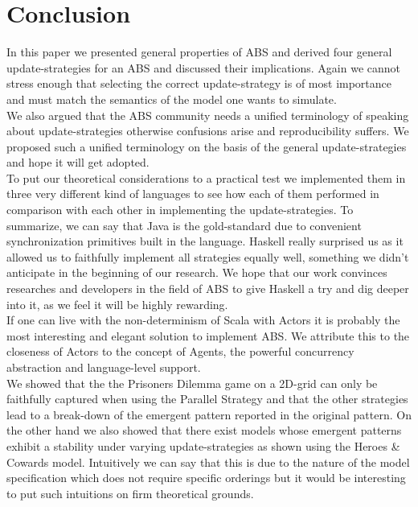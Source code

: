 \section{Conclusion}
In this paper we presented general properties of ABS and derived four general update-strategies for an ABS and discussed their implications. Again we cannot stress enough that selecting the correct update-strategy is of most importance and must match the semantics of the model one wants to simulate. \\
We also argued that the ABS community needs a unified terminology of speaking about update-strategies otherwise confusions arise and reproducibility suffers. We proposed such a unified terminology on the basis of the general update-strategies and hope it will get adopted. \\
To put our theoretical considerations to a practical test we implemented them in three very different kind of languages to see how each of them performed in comparison with each other in implementing the update-strategies. To summarize, we can say that Java is the gold-standard due to convenient synchronization primitives built in the language. Haskell really surprised us as it allowed us to faithfully implement all strategies equally well, something we didn't anticipate in the beginning of our research. We hope that our work convinces researches and developers in the field of ABS to give Haskell a try and dig deeper into it, as we feel it will be highly rewarding. \\
If one can live with the non-determinism of Scala with Actors it is probably the most interesting and elegant solution to implement ABS. We attribute this to the closeness of Actors to the concept of Agents, the powerful concurrency abstraction and language-level support. \\
We showed that the the Prisoners Dilemma game on a 2D-grid can only be faithfully captured when using the Parallel Strategy and that the other strategies lead to a break-down of the emergent pattern reported in the original pattern. On the other hand we also showed that there exist models whose emergent patterns exhibit a stability under varying update-strategies as shown using the Heroes \& Cowards model. Intuitively we can say that this is due to the nature of the model specification which does not require specific orderings but it would be interesting to put such intuitions on firm theoretical grounds.